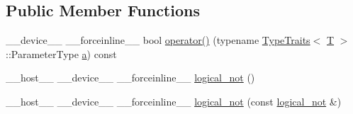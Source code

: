 \subsection*{Public Member Functions}
\begin{DoxyCompactItemize}
\item 
\-\_\-\-\_\-device\-\_\-\-\_\- \-\_\-\-\_\-forceinline\-\_\-\-\_\- bool \hyperlink{structcv_1_1gpu_1_1device_1_1logical__not_afe4754e722500510dc4d9008139e1778}{operator()} (typename \hyperlink{structcv_1_1gpu_1_1device_1_1TypeTraits}{Type\-Traits}$<$ \hyperlink{calib3d_8hpp_a3efb9551a871ddd0463079a808916717}{T} $>$\-::Parameter\-Type \hyperlink{legacy_8hpp_a1031d0e0a97a340abfe0a6ab9e831045}{a}) const 
\item 
\-\_\-\-\_\-host\-\_\-\-\_\- \-\_\-\-\_\-device\-\_\-\-\_\- \-\_\-\-\_\-forceinline\-\_\-\-\_\- \hyperlink{structcv_1_1gpu_1_1device_1_1logical__not_a1189a5e3440d158078534c2b3bcd1994}{logical\-\_\-not} ()
\item 
\-\_\-\-\_\-host\-\_\-\-\_\- \-\_\-\-\_\-device\-\_\-\-\_\- \-\_\-\-\_\-forceinline\-\_\-\-\_\- \hyperlink{structcv_1_1gpu_1_1device_1_1logical__not_aedb61048b67caee6228331488db1f66b}{logical\-\_\-not} (const \hyperlink{structcv_1_1gpu_1_1device_1_1logical__not}{logical\-\_\-not} \&)
\end{DoxyCompactItemize}


